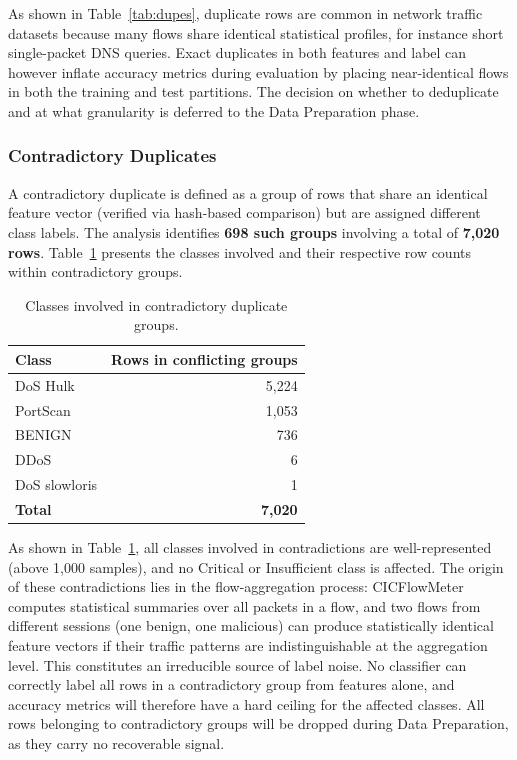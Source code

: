 \documentclass[12pt,a4paper]{article}
\begin{document}
As shown in Table~\ref{tab:dupes}, duplicate rows are common in network traffic
datasets because many flows share identical statistical profiles, for instance short
single-packet DNS queries. Exact duplicates in both features and label can however
inflate accuracy metrics during evaluation by placing near-identical flows in both the
training and test partitions. The decision on whether to deduplicate and at what
granularity is deferred to the Data Preparation phase.

\subsubsection{Contradictory Duplicates}
\label{sec:contradictory}

A contradictory duplicate is defined as a group of rows that share an identical feature
vector (verified via hash-based comparison) but are assigned different class labels. The
analysis identifies \textbf{698 such groups} involving a total of \textbf{7,020 rows}.
Table~\ref{tab:contradictory} presents the classes involved and their respective row
counts within contradictory groups.

\begin{table}[H]
    \centering
    \caption{Classes involved in contradictory duplicate groups.}
    \label{tab:contradictory}
    \begin{tabular}{|l|r|}
        \hline
        \textbf{Class} & \textbf{Rows in conflicting groups} \\
        \hline
        DoS Hulk       & 5,224                               \\
        \hline
        PortScan       & 1,053                               \\
        \hline
        BENIGN         & 736                                 \\
        \hline
        DDoS           & 6                                   \\
        \hline
        DoS slowloris  & 1                                   \\
        \hline
        \textbf{Total} & \textbf{7,020}                      \\
        \hline
    \end{tabular}
\end{table}

As shown in Table~\ref{tab:contradictory}, all classes involved in contradictions are
well-represented (above 1,000 samples), and no Critical or Insufficient class is affected.
The origin of these contradictions lies in the flow-aggregation process: CICFlowMeter
computes statistical summaries over all packets in a flow, and two flows from different
sessions (one benign, one malicious) can produce statistically identical feature vectors
if their traffic patterns are indistinguishable at the aggregation level. This constitutes
an irreducible source of label noise. No classifier can correctly label all rows in a
contradictory group from features alone, and accuracy metrics will therefore have a hard
ceiling for the affected classes. All rows belonging to contradictory groups will be
dropped during Data Preparation, as they carry no recoverable signal.
\end{document}
